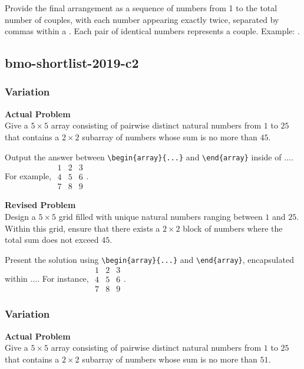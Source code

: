 Provide the final arrangement as a sequence of numbers from 1 to the total number of couples, with each number appearing exactly twice, separated by commas within a \boxed. Each pair of identical numbers represents a couple. Example: .

\subsection{bmo-shortlist-2019-c2}
\subsubsection{Variation}
\textbf{Actual Problem}\\
Give a $5\times 5$ array consisting of pairwise distinct natural numbers from $1$ to $25$ that contains a $2\times 2$ subarray of numbers whose sum is no more than $45$.

Output the answer between \verb|\begin{array}{...}| and \verb|\end{array}| inside of $\boxed{...}$. For example, $\boxed{\begin{array}{ccc}1 & 2 & 3 \\ 4 & 5 & 6 \\ 7 & 8 & 9\end{array}}$.

\textbf{Revised Problem}\\
Design a $5\times 5$ grid filled with unique natural numbers ranging between $1$ and $25$. Within this grid, ensure that there exists a $2\times 2$ block of numbers where the total sum does not exceed $45$.

Present the solution using \verb|\begin{array}{...}| and \verb|\end{array}|, encapsulated within $\boxed{...}$. For instance, $\boxed{\begin{array}{ccc}1 & 2 & 3 \\ 4 & 5 & 6 \\ 7 & 8 & 9\end{array}}$.

\subsubsection{Variation}
\textbf{Actual Problem}\\
Give a $5\times 5$ array consisting of pairwise distinct natural numbers from $1$ to $25$ that contains a $2\times 2$ subarray of numbers whose sum is no more than $51$.

